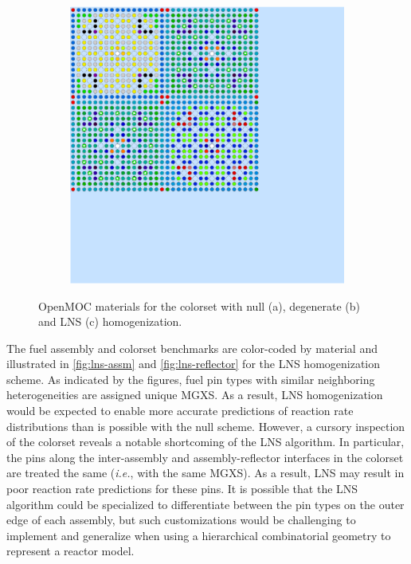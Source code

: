\begin{figure}[h!]
\begin{subfigure}{0.33\textwidth}
  \caption{}
  \label{fig:degenerate-reflector}
\end{subfigure}
\begin{subfigure}{0.33\textwidth}
  \centering
  \includegraphics[width=0.9\linewidth]{figures/reflector/lns-materials}
  \caption{}
  \label{fig:lns-reflector}
\end{subfigure}
\caption{OpenMOC materials for the colorset with null (a), degenerate (b) and LNS (c) homogenization.}
\label{fig:benchmarks-colorset}
\end{figure}

The fuel assembly and colorset benchmarks are color-coded by material and illustrated in \autoref{fig:lns-assm} and \autoref{fig:lns-reflector} for the LNS homogenization scheme. As indicated by the figures, fuel pin types with similar neighboring heterogeneities are assigned unique MGXS. As a result, LNS homogenization would be expected to enable more accurate predictions of reaction rate distributions than is possible with the null scheme. However, a cursory inspection of the colorset reveals a notable shortcoming of the LNS algorithm. In particular, the pins along the inter-assembly and assembly-reflector interfaces in the colorset are treated the same (\textit{i.e.}, with the same MGXS). As a result, LNS may result in poor reaction rate predictions for these pins. It is possible that the LNS algorithm could be specialized to differentiate between the pin types on the outer edge of each assembly, but such customizations would be challenging to implement and generalize when using a hierarchical combinatorial geometry to represent a reactor model.

